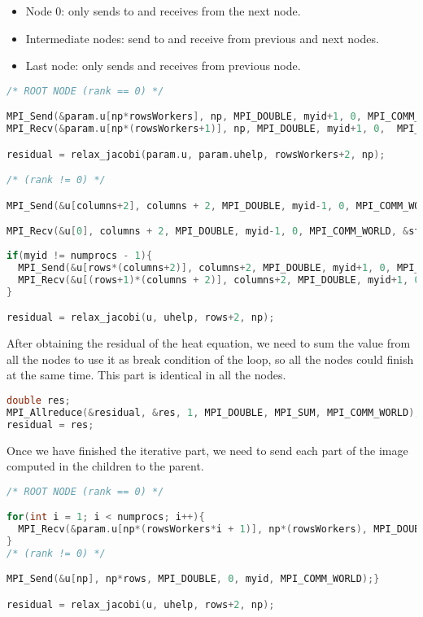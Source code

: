 \documentclass[a4paper, 10pt]{article}
\begin{document}
\begin{itemize}
  \item Node 0: only sends to and receives from the next node.
  \item Intermediate nodes: send to and receive from previous and next nodes.
  \item Last node: only sends and receives from previous node.
\end{itemize}

\begin{lstlisting}[language=c, caption={Communications between nodes inside the iterations}]
/* ROOT NODE (rank == 0) */

MPI_Send(&param.u[np*rowsWorkers], np, MPI_DOUBLE, myid+1, 0, MPI_COMM_WORLD);
MPI_Recv(&param.u[np*(rowsWorkers+1)], np, MPI_DOUBLE, myid+1, 0,  MPI_COMM_WORLD, &status);

residual = relax_jacobi(param.u, param.uhelp, rowsWorkers+2, np); 

/* (rank != 0) */

MPI_Send(&u[columns+2], columns + 2, MPI_DOUBLE, myid-1, 0, MPI_COMM_WORLD);

MPI_Recv(&u[0], columns + 2, MPI_DOUBLE, myid-1, 0, MPI_COMM_WORLD, &status);
                    
if(myid != numprocs - 1){
  MPI_Send(&u[rows*(columns+2)], columns+2, MPI_DOUBLE, myid+1, 0, MPI_COMM_WORLD);
  MPI_Recv(&u[(rows+1)*(columns + 2)], columns+2, MPI_DOUBLE, myid+1, 0, MPI_COMM_WORLD, &status);
}

residual = relax_jacobi(u, uhelp, rows+2, np);
\end{lstlisting}

After obtaining the residual of the heat equation, we need to sum the value from all the nodes to use it as break condition of the loop, so all the nodes could finish at the same time. This part is identical in all the nodes.

\begin{lstlisting}[language=c, caption={Allreduce for residual value}]
double res;
MPI_Allreduce(&residual, &res, 1, MPI_DOUBLE, MPI_SUM, MPI_COMM_WORLD);
residual = res;
\end{lstlisting}

Once we have finished the iterative part, we need to send each part of the image computed in the children to the parent.

\begin{lstlisting}[language=c, caption={Communication of the computed image to the parent}]
/* ROOT NODE (rank == 0) */

for(int i = 1; i < numprocs; i++){
  MPI_Recv(&param.u[np*(rowsWorkers*i + 1)], np*(rowsWorkers), MPI_DOUBLE, i, i, MPI_COMM_WORLD, &status);
}
/* (rank != 0) */

MPI_Send(&u[np], np*rows, MPI_DOUBLE, 0, myid, MPI_COMM_WORLD);}

residual = relax_jacobi(u, uhelp, rows+2, np);
\end{lstlisting}
\end{document}
